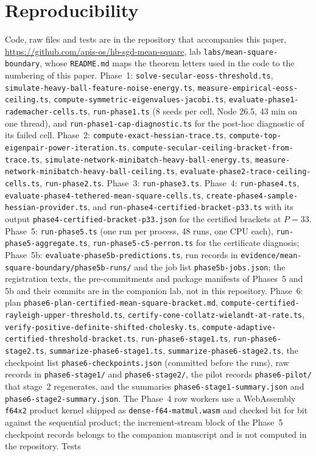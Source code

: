 \documentclass[11pt]{article}
\theoremstyle{remark}
\begin{document}
\section*{Reproducibility}
\begin{sloppypar}
Code, raw files and tests are in the repository that accompanies this paper, \url{https://github.com/apis-os/hb-sgd-mean-square}, lab \nolinkurl{labs/mean-square-boundary}, whose \nolinkurl{README.md} maps the theorem letters used in the code to the numbering of this paper. Phase~1: \nolinkurl{solve-secular-eoss-threshold.ts}, \nolinkurl{simulate-heavy-ball-feature-noise-energy.ts}, \nolinkurl{measure-empirical-eoss-ceiling.ts}, \nolinkurl{compute-symmetric-eigenvalues-jacobi.ts}, \nolinkurl{evaluate-phase1-rademacher-cells.ts}, \nolinkurl{run-phase1.ts} (8 seeds per cell, Node 26.5, 43 min on one thread), and \nolinkurl{run-phase1-cap-diagnostic.ts} for the post-hoc diagnostic of its failed cell. Phase~2: \nolinkurl{compute-exact-hessian-trace.ts}, \nolinkurl{compute-top-eigenpair-power-iteration.ts}, \nolinkurl{compute-secular-ceiling-bracket-from-trace.ts}, \nolinkurl{simulate-network-minibatch-heavy-ball-energy.ts}, \nolinkurl{measure-network-minibatch-heavy-ball-ceiling.ts}, \nolinkurl{evaluate-phase2-trace-ceiling-cells.ts}, \nolinkurl{run-phase2.ts}. Phase~3: \nolinkurl{run-phase3.ts}. Phase~4: \nolinkurl{run-phase4.ts}, \nolinkurl{evaluate-phase4-tethered-mean-square-cells.ts}, \nolinkurl{create-phase4-sample-hessian-provider.ts}, and \nolinkurl{run-phase4-certified-bracket-p33.ts} with its output \nolinkurl{phase4-certified-bracket-p33.json} for the certified brackets at $P=33$. Phase~5: \nolinkurl{run-phase5.ts} (one run per process, 48 runs, one CPU each), \nolinkurl{run-phase5-aggregate.ts}, \nolinkurl{run-phase5-c5-perron.ts} for the certificate diagnosis; Phase~5b: \nolinkurl{evaluate-phase5b-predictions.ts}, run records in \nolinkurl{evidence/mean-square-boundary/phase5b-runs/} and the job list \nolinkurl{phase5b-jobs.json}; the registration texts, the pre-commitments and package manifests of Phases~5 and 5b and their commits are in the companion lab, not in this repository. Phase~6: plan \nolinkurl{phase6-plan-certified-mean-square-bracket.md}, \nolinkurl{compute-certified-rayleigh-upper-threshold.ts}, \nolinkurl{certify-cone-collatz-wielandt-at-rate.ts}, \nolinkurl{verify-positive-definite-shifted-cholesky.ts}, \nolinkurl{compute-adaptive-certified-threshold-bracket.ts}, \nolinkurl{run-phase6-stage1.ts}, \nolinkurl{run-phase6-stage2.ts}, \nolinkurl{summarize-phase6-stage1.ts}, \nolinkurl{summarize-phase6-stage2.ts}, the checkpoint list \nolinkurl{phase6-checkpoints.json} (committed before the runs), raw records in \nolinkurl{phase6-stage1/} and \nolinkurl{phase6-stage2/}, the pilot records \nolinkurl{phase6-pilot/} that stage~2 regenerates, and the summaries \nolinkurl{phase6-stage1-summary.json} and \nolinkurl{phase6-stage2-summary.json}. The Phase~4 row workers use a WebAssembly \nolinkurl{f64x2} product kernel shipped as \nolinkurl{dense-f64-matmul.wasm} and checked bit for bit against the sequential product; the increment-stream block of the Phase~5 checkpoint records belongs to the companion manuscript and is not computed in the repository. Tests 
\end{sloppypar}
\end{document}
